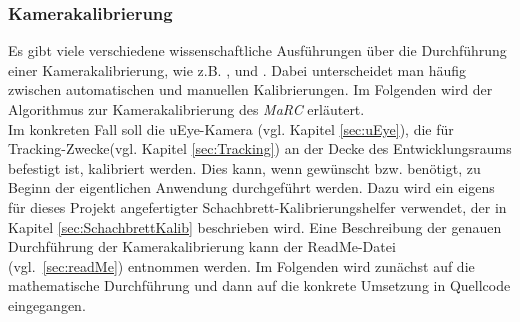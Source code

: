 \subsubsection{Kamerakalibrierung}\label{sec:camCalib}
Es gibt viele verschiedene wissenschaftliche Ausführungen über die Durchführung einer Kamerakalibrierung, wie z.B. \cite{5982395}, \cite{888718} und \cite{faugeras1993three}. Dabei unterscheidet man häufig zwischen automatischen und manuellen Kalibrierungen. Im Folgenden wird der Algorithmus zur Kamerakalibrierung des \textit{MaRC} erläutert.  \\
Im konkreten Fall soll die uEye-Kamera (vgl. Kapitel \ref{sec:uEye}), die für Tracking-Zwecke(vgl. Kapitel \ref{sec:Tracking}) an der Decke des Entwicklungsraums befestigt ist, kalibriert werden. Dies kann, wenn gewünscht bzw. benötigt, zu Beginn der eigentlichen Anwendung durchgeführt werden. Dazu wird ein eigens für dieses Projekt angefertigter Schachbrett-Kalibrierungshelfer verwendet, der in Kapitel \ref{sec:SchachbrettKalib} beschrieben wird. Eine Beschreibung der genauen Durchführung der Kamerakalibrierung kann der ReadMe-Datei (vgl.~\ref{sec:readMe}) entnommen werden. Im Folgenden wird zunächst auf die mathematische Durchführung und dann auf die konkrete Umsetzung in Quellcode eingegangen.\\

